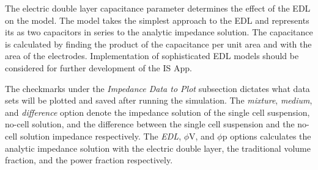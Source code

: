 \par The electric double layer capacitance parameter determines the effect of the EDL on the model. The model takes the simplest approach to the EDL and represents its as two capacitors in series to the analytic impedance solution. The capacitance is calculated by finding the product of the capacitance per unit area and with the area of the electrodes. Implementation of sophisticated EDL models should be considered for further development of the IS App. 

\par The checkmarks under the \textit{Impedance Data to Plot} subsection dictates what data sets will be plotted and saved after running the simulation. The \textit{mixture}, \textit{medium}, and \textit{difference} option denote the impedance solution of the single cell suspension, no-cell solution, and the difference between the single cell suspension and the no-cell solution impedance respectively. The \textit{EDL}, $\phi$V, and $\phi$p options calculates the analytic impedance solution with the electric double layer, the traditional volume fraction, and the power fraction respectively.

